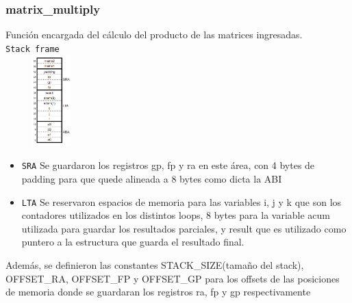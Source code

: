 \documentclass[a4paper,10pt, spanish]{article}
\begin{document}
\subsubsection{matrix\_multiply}
Función encargada del cálculo del producto de las matrices ingresadas. \\
    \lstinline{Stack frame} \\
            \includegraphics[max height=100pt,max width=100pt]{./stack_matrix_multiply.png}
            \begin{itemize}
                \item \lstinline{SRA}
                Se guardaron los registros gp, fp y ra en este área, con 4 bytes de padding para que quede alineada a 8 bytes como dicta la ABI
                \item \lstinline{LTA}
                Se reservaron espacios de memoria para las variables i, j y k que son los contadores utilizados en los distintos loops, 8 bytes para la variable acum utilizada para guardar los resultados parciales, y result que es utilizado como puntero a la estructura que guarda el resultado final.
            \end{itemize}

           Además, se definieron las constantes STACK\_SIZE(tamaño del stack), OFFSET\_RA, OFFSET\_FP y OFFSET\_GP para los offsets de las posiciones de memoria donde se guardaran los registros ra, fp y gp respectivamente
\end{document}
